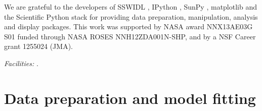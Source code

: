 \documentclass[onecolumn]{emulateapj}
\begin{document}
\acknowledgments

We are grateful to the developers of SSWIDL
\citep{1998SoPh..182..497F}, IPython \citep{ipython}, SunPy
\citep{mumford-proc-scipy-2013}, matplotlib
\citep{Hunter:2007} and the Scientific Python stack for providing data
preparation, manipulation, analysis and display packages.  This work
was supported by NASA award NNX13AE03G S01 funded through NASA ROSES
NNH12ZDA001N-SHP, and by a NSF Career grant 1255024 (JMA).




{\it Facilities:} .



\appendix\section{Data preparation and model
  fitting}\label{sec:app:data}
\end{document}
